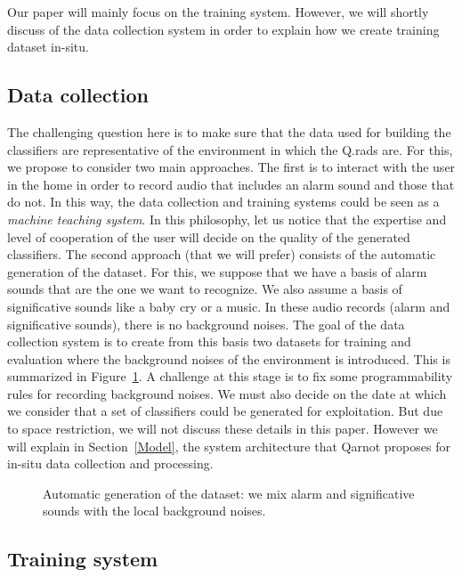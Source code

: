 \documentclass[10pt, conference, compsocconf]{IEEEtran}
\begin{document}
Our paper will mainly focus on the training system. However, we will shortly discuss of the data collection system in order 
to explain how we create training dataset in-situ.


\subsection{Data collection}

The challenging question here is to make sure that the data used for building the classifiers are representative of the environment 
in which the Q.rads are. For this, we propose to consider two main approaches. The first is to interact with the user in the 
home in order to record audio that includes an alarm sound and those that do not. In this way, the data collection and training systems 
could be seen as a {\it machine teaching system}. In this philosophy, let us notice that the expertise and level of cooperation 
of the user will decide on the quality of the generated classifiers. 
The second approach (that we will prefer) consists of the automatic generation of the dataset. 
For this, we suppose that we have a basis of alarm sounds that are the one we want to recognize. We also assume a basis of significative 
sounds like a baby cry or a music. In these audio records (alarm and significative sounds), there is no background 
noises. The goal of the data collection system is to create from this basis two datasets for training and evaluation where 
the background noises of the environment is introduced. This is summarized in Figure~\ref{fig:gen}. 
A challenge at this stage is to fix some programmability rules for recording 
background noises. We must also decide on the date at which we consider that a set of classifiers could be generated for exploitation. 
But due to space restriction, we will not discuss these details in this paper. However we will explain in Section~\ref{Model}, the 
system architecture that Qarnot proposes for in-situ data collection and processing.


	\begin{figure}[hbtp]
	\begin{center}
	
	\caption{Automatic generation of the dataset: we mix alarm and significative sounds with the local background noises.}
	\label{fig:gen}
	\end{center}
	\end{figure}


\subsection{Training system}
\end{document}
